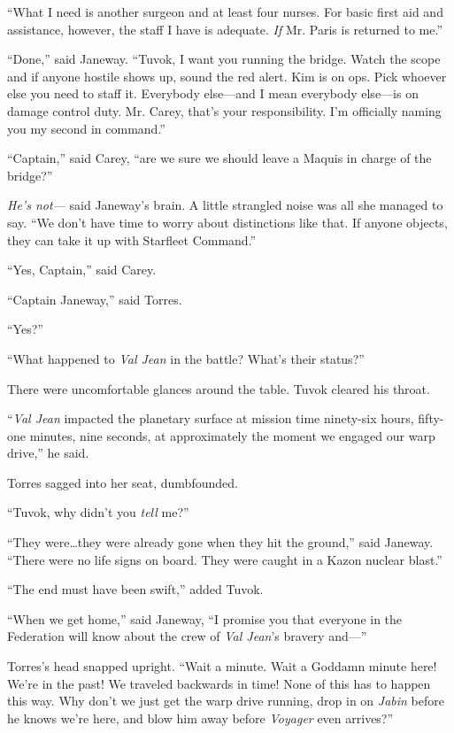 \documentclass[twoside,letterpaper,12pt]{memoir}
\begin{document}
``What I need is another surgeon and at least four nurses. For basic first aid and assistance, however, the staff I have is adequate. \textit{If} Mr. Paris is returned to me.'' 

``Done,'' said Janeway. ``Tuvok, I want you running the bridge. Watch the scope and if anyone hostile shows up, sound the red alert. Kim is on ops. Pick whoever else you need to staff it. Everybody else---and I mean everybody else---is on damage control duty. Mr. Carey, that's your responsibility. I'm officially naming you my second in command.'' 

``Captain,'' said Carey, ``are we sure we should leave a Maquis in charge of the bridge?'' 

\textit{He's not---} said Janeway's brain. A little strangled noise was all she managed to say. ``We don't have time to worry about distinctions like that. If anyone objects, they can take it up with Starfleet Command.'' 

``Yes, Captain,'' said Carey. 

``Captain Janeway,'' said Torres. 

``Yes?'' 

``What happened to \textit{Val Jean} in the battle? What's their status?'' 

There were uncomfortable glances around the table. Tuvok cleared his throat. 

``\textit{Val Jean} impacted the planetary surface at mission time ninety-six hours, fifty-one minutes, nine seconds, at approximately the moment we engaged our warp drive,'' he said. 

Torres sagged into her seat, dumbfounded. 

``Tuvok, why didn't you \textit{tell} me?'' 

``They were\ldots they were already gone when they hit the ground,'' said Janeway. ``There were no life signs on board. They were caught in a Kazon nuclear blast.'' 

``The end must have been swift,'' added Tuvok. 

``When we get home,'' said Janeway, ``I promise you that everyone in the Federation will know about the crew of \textit{Val Jean}'s bravery and---'' 

Torres's head snapped upright. ``Wait a minute. Wait a Goddamn minute here! We're in the past! We traveled backwards in time! None of this has to happen this way. Why don't we just get the warp drive running, drop in on \textit{Jabin} before he knows we're here, and blow him away before \textit{Voyager} even arrives?'' 
\end{document}
